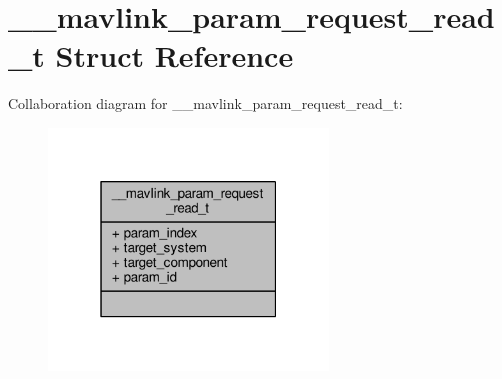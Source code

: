 \hypertarget{struct____mavlink__param__request__read__t}{\section{\+\_\+\+\_\+mavlink\+\_\+param\+\_\+request\+\_\+read\+\_\+t Struct Reference}
\label{struct____mavlink__param__request__read__t}
}


Collaboration diagram for \+\_\+\+\_\+mavlink\+\_\+param\+\_\+request\+\_\+read\+\_\+t\+:
\nopagebreak
\begin{figure}[H]
\begin{center}
\leavevmode
\includegraphics[width=211pt]{struct____mavlink__param__request__read__t__coll__graph}
\end{center}
\end{figure}
